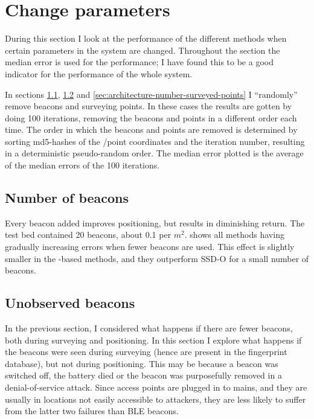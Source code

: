 \section{Change parameters}
During this section I look at the performance of the different methods when certain parameters in the system are changed.
Throughout the section the median error is used for the performance; I have found this to be a good indicator for the performance of the whole system.

In sections \ref{sec:architecture-number-beacons}, \ref{sec:architecture-dying-beacons} and \ref{sec:architecture-number-surveyed-points} I ``randomly'' remove beacons and surveying points.
In these cases the results are gotten by doing 100 iterations, removing the beacons and points in a different order each time.
The order in which the beacons and points are removed is determined by sorting md5-hashes of the \bid/point coordinates and the iteration number, resulting in a deterministic pseudo-random order.
The median error plotted is the average of the median errors of the 100 iterations.


\subsection{Number of beacons}
\label{sec:architecture-number-beacons}
Every beacon added improves positioning, but results in diminishing return.
The test bed contained 20 beacons, about 0.1 per $m^2$.
 shows all methods having gradually increasing errors when fewer beacons are used.
This effect is slightly smaller in the \aBRP-based methods, and they outperform SSD-O for a small number of beacons.


\subsection{Unobserved beacons}
\label{sec:architecture-dying-beacons}
In the previous section, I considered what happens if there are fewer beacons, both during surveying and positioning.
In this section I explore what happens if the beacons were seen during surveying (hence are present in the fingerprint database), but not during positioning.
This may be because a beacon was switched off, the battery died or the beacon was purposefully removed in a denial-of-service attack.
Since \wifi access points are plugged in to mains, and they are usually in locations not easily accessible to attackers, they are less likely to suffer from the latter two failures than BLE beacons.

